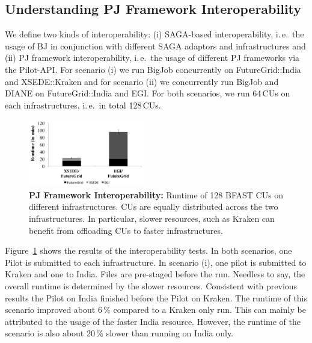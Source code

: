 \documentclass[conference,final]{IEEEtran}
\newcommand{\jhanote}[1]{ {\textcolor{red} { ***shantenu: #1 }}}
\newcommand{\alnote}[1]{ {\textcolor{blue} { ***andreL: #1 }}}
\newcommand{\alnote}[1]{}
\newcommand{\jhanote}[1]{}
\newcommand{\pilot}{Pilot\xspace}
\newcommand{\cus}{CUs\xspace}
\newcommand{\upp}{\vspace*{-0.5em}}
\begin{document}



\subsection{Understanding PJ Framework Interoperability\upp\upp}
\label{sec:experiment-interop}

We define two kinds of interoperability: (i) SAGA-based
interoperability, i.\,e.\ the usage of BJ in conjunction with
different SAGA adaptors and infrastructures and (ii) PJ framework
interoperability, i.\,e.\ the usage of different PJ frameworks via the
Pilot-API. For scenario (i) we run BigJob concurrently on FutureGrid::India
and XSEDE::Kraken and for scenario (ii) we concurrently run BigJob and DIANE
on FutureGrid::India and EGI. For both scenarios, we run 64\,\cus on each 
infrastructures, i.\,e.\ in total 128\,\cus.

\begin{figure}[htbp]
	\centering
	\includegraphics[width=0.45\textwidth]{perf/interop/128-bfast-interop.pdf}
	\caption{\textbf{PJ Framework Interoperability:} Runtime of 128 BFAST \cus 
	on different infrastructures. \cus are equally distributed across the two 
	infrastructures. In particular, slower resources, such as Kraken can benefit 
	from offloading \cus to faster infrastructures.}
	\label{fig:perf_interop_128-bfast-interop}
\end{figure}


Figure~\ref{fig:perf_interop_128-bfast-interop} shows the results of the
interoperability tests. In both scenarios, one \pilot is submitted to each
infrastructure. In scenario (i), one pilot is submitted to Kraken and one to
India. Files are pre-staged before the run. Needless to say, the overall runtime
is determined by the slower resources. Consistent with previous results the
\pilot on India finished before the \pilot on Kraken. The runtime of this
scenario improved about 6\,\% compared to a Kraken only run. This can mainly be
attributed to the usage of the faster India resource. However, the runtime of
the scenario is also about 20\,\% slower than running on India only.
\end{document}
